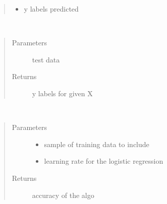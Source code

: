 \documentclass[letterpaper,10pt,english]{sphinxmanual}
\begin{document}
\begin{fulllineitems}
\begin{fulllineitems}
\begin{quote}
\begin{description}
\begin{itemize}
\item {} 
 \textendash{} y labels predicted

\end{itemize}

\end{description}\end{quote}

\end{fulllineitems}


\begin{fulllineitems}
\label{\detokenize{classifiers:classifiers.logistic_regression.LogisticRegression.predict}}~\begin{quote}\begin{description}
\item[{Parameters}] \leavevmode
{} \textendash{} test data

\item[{Returns}] \leavevmode
y labels for given X

\end{description}\end{quote}

\end{fulllineitems}


\end{fulllineitems}


\begin{fulllineitems}
\label{\detokenize{classifiers:classifiers.logistic_regression.one_to_rest}}~\begin{quote}\begin{description}
\item[{Parameters}] \leavevmode\begin{itemize}
\item {} 
 \textendash{} sample of training data to include

\item {} 
 \textendash{} learning rate for the logistic regression

\end{itemize}

\item[{Returns}] \leavevmode
accuracy of the algo

\end{description}\end{quote}

\end{fulllineitems}
\end{document}
